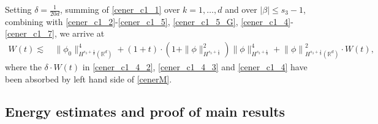 \documentclass[10pt,twoside,a4paper]{article}
\numberwithin{equation}{section}\allowdisplaybreaks
\def\leq{\leqslant}
\begin{document}
Setting $ \delta=\frac{1}{20d} $,
 summing of \eqref{cener_c1_1} over $ k=1,\dots, d $ and over $ |\beta|\leq s_3-1 $, combining with \eqref{cener_c1_2}-\eqref{cener_c1_5}, \eqref{cener_c1_5_G}, \eqref{cener_c1_4}-\eqref{cener_c1_7}, we  arrive at
\begin{align}  \label{cenerM}
	W(t) 
	\lesssim &\,  \|\phi_0\|^4_{H^{s_3+\frac 12}(\mathbb{R}^{d})} +  (1+t)\cdot\left(1+\|\phi\|_{H^{s_3+\frac 12}}^2\right)\|\phi\|_{H^{s_3+\frac 12}}^4+\left\|  \phi\right\|_{H^{s_3+\frac 12}(\mathbb{R}^d)}^2 \cdot W (t),
\end{align}
where the $ \delta \cdot W(t) $ in \eqref{cener_c1_4_2}, \eqref{cener_c1_4_3} and \eqref{cener_c1_4} have been absorbed by left hand side of \eqref{cenerM}.




\subsection{Energy estimates and proof of main results}  \label{s4.2}
\end{document}

